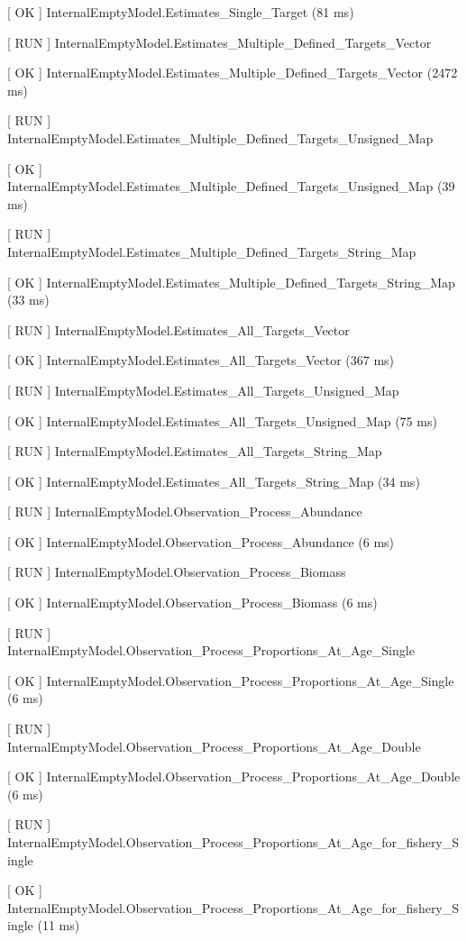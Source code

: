 \documentclass[a4paper,11pt,twoside,pdftex,draft]{article}
\begin{document}
{[} OK {]} InternalEmptyModel.Estimates\_Single\_Target (81 ms)

{[} RUN {]}
InternalEmptyModel.Estimates\_Multiple\_Defined\_Targets\_Vector

{[} OK {]}
InternalEmptyModel.Estimates\_Multiple\_Defined\_Targets\_Vector (2472
ms)

{[} RUN {]}
InternalEmptyModel.Estimates\_Multiple\_Defined\_Targets\_Unsigned\_Map

{[} OK {]}
InternalEmptyModel.Estimates\_Multiple\_Defined\_Targets\_Unsigned\_Map
(39 ms)

{[} RUN {]}
InternalEmptyModel.Estimates\_Multiple\_Defined\_Targets\_String\_Map

{[} OK {]}
InternalEmptyModel.Estimates\_Multiple\_Defined\_Targets\_String\_Map
(33 ms)

{[} RUN {]} InternalEmptyModel.Estimates\_All\_Targets\_Vector

{[} OK {]} InternalEmptyModel.Estimates\_All\_Targets\_Vector (367 ms)

{[} RUN {]} InternalEmptyModel.Estimates\_All\_Targets\_Unsigned\_Map

{[} OK {]} InternalEmptyModel.Estimates\_All\_Targets\_Unsigned\_Map (75
ms)

{[} RUN {]} InternalEmptyModel.Estimates\_All\_Targets\_String\_Map

{[} OK {]} InternalEmptyModel.Estimates\_All\_Targets\_String\_Map (34
ms)

{[} RUN {]} InternalEmptyModel.Observation\_Process\_Abundance

{[} OK {]} InternalEmptyModel.Observation\_Process\_Abundance (6 ms)

{[} RUN {]} InternalEmptyModel.Observation\_Process\_Biomass

{[} OK {]} InternalEmptyModel.Observation\_Process\_Biomass (6 ms)

{[} RUN {]}
InternalEmptyModel.Observation\_Process\_Proportions\_At\_Age\_Single

{[} OK {]}
InternalEmptyModel.Observation\_Process\_Proportions\_At\_Age\_Single (6
ms)

{[} RUN {]}
InternalEmptyModel.Observation\_Process\_Proportions\_At\_Age\_Double

{[} OK {]}
InternalEmptyModel.Observation\_Process\_Proportions\_At\_Age\_Double (6
ms)

{[} RUN {]}
InternalEmptyModel.Observation\_Process\_Proportions\_At\_Age\_for\_fishery\_Single

{[} OK {]}
InternalEmptyModel.Observation\_Process\_Proportions\_At\_Age\_for\_fishery\_Single
(11 ms)
\end{document}
